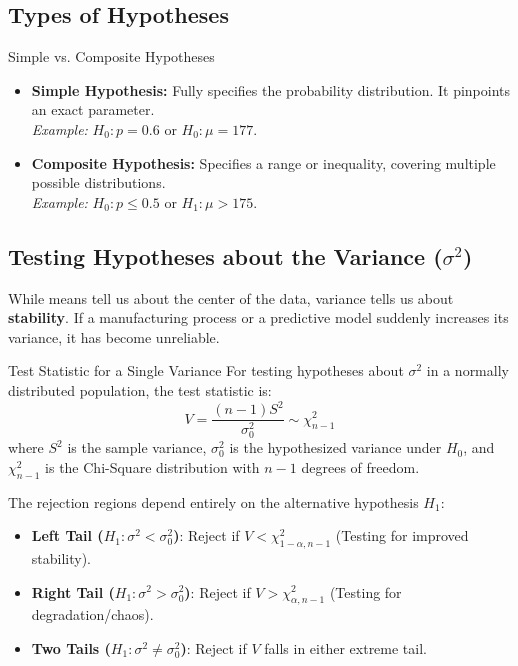 \subsection{Types of Hypotheses}

\begin{defbox}{Simple vs. Composite Hypotheses}
 \begin{itemize}
  \item \textbf{Simple Hypothesis:} Fully specifies the probability distribution. It pinpoints an exact parameter. \\
  \textit{Example:} $H_0: p = 0.6$ or $H_0: \mu = 177$.
  
  \item \textbf{Composite Hypothesis:} Specifies a range or inequality, covering multiple possible distributions. \\
  \textit{Example:} $H_0: p \leq 0.5$ or $H_1: \mu > 175$.
 \end{itemize}
\end{defbox}

\subsection{Testing Hypotheses about the Variance ($\sigma^2$)}

While means tell us about the center of the data, variance tells us about \textbf{stability}. If a manufacturing process or a predictive model suddenly increases its variance, it has become unreliable.



\begin{defbox}{Test Statistic for a Single Variance}
 For testing hypotheses about $\sigma^2$ in a normally distributed population, the test statistic is:
 \begin{equation}
     V = \frac{(n-1)S^2}{\sigma_0^2} \sim \chi^2_{n-1}
 \end{equation}
 where $S^2$ is the sample variance, $\sigma_0^2$ is the hypothesized variance under $H_0$, and $\chi^2_{n-1}$ is the Chi-Square distribution with $n-1$ degrees of freedom.
\end{defbox}

The rejection regions depend entirely on the alternative hypothesis $H_1$:
\begin{itemize}
 \item \textbf{Left Tail ($H_1: \sigma^2 < \sigma_0^2$)}: Reject if $V < \chi^2_{1-\alpha, n-1}$ (Testing for improved stability).
 \item \textbf{Right Tail ($H_1: \sigma^2 > \sigma_0^2$)}: Reject if $V > \chi^2_{\alpha, n-1}$ (Testing for degradation/chaos).
 \item \textbf{Two Tails ($H_1: \sigma^2 \neq \sigma_0^2$)}: Reject if $V$ falls in either extreme tail.
\end{itemize}

